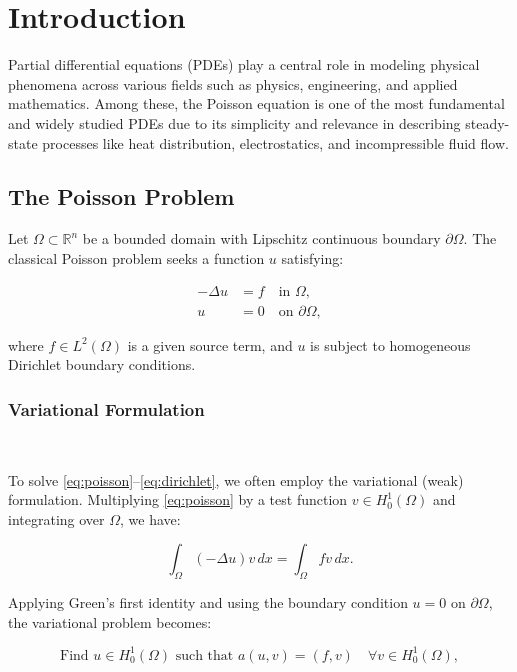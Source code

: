 \documentclass[class=article, crop=false]{standalone}
\begin{document}
\section{Introduction}

Partial differential equations (PDEs) play a central role in modeling physical phenomena across various fields such as physics, engineering, and applied mathematics. Among these, the Poisson equation is one of the most fundamental and widely studied PDEs due to its simplicity and relevance in describing steady-state processes like heat distribution, electrostatics, and incompressible fluid flow.

\subsection{The Poisson Problem}

Let $\Omega \subset \mathbb{R}^n$ be a bounded domain with Lipschitz continuous boundary $\partial \Omega$. The classical Poisson problem seeks a function $u$ satisfying:

\begin{align}
    -\Delta u &= f \quad \text{in } \Omega, \label{eq:poisson}\\
    u &= 0 \quad \text{on } \partial \Omega, \label{eq:dirichlet}
\end{align}

where $f \in L^2(\Omega)$ is a given source term, and $u$ is subject to homogeneous Dirichlet boundary conditions.

\subsubsection{Variational Formulation} 

To solve \eqref{eq:poisson}--\eqref{eq:dirichlet}, we often employ the variational (weak) formulation. Multiplying \eqref{eq:poisson} by a test function $v \in H_0^1(\Omega)$ and integrating over $\Omega$, we have:

\[
\int_\Omega (-\Delta u) v \, dx = \int_\Omega f v \, dx.
\]

Applying Green's first identity and using the boundary condition $u = 0$ on $\partial \Omega$, the variational problem becomes:

\begin{equation}
\text{Find } u \in H_0^1(\Omega) \text{ such that } a(u, v) = (f, v) \quad \forall v \in H_0^1(\Omega), \label{eq:variational}
\end{equation}
\end{document}
